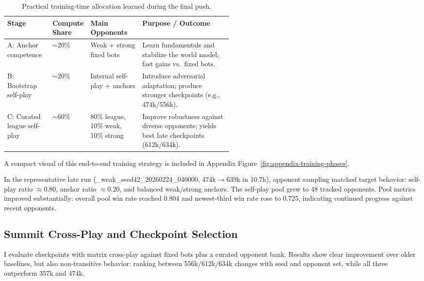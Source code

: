 \documentclass[11pt]{article}
\begin{document}
\begin{table}[h]
\centering
\footnotesize
\setlength{\tabcolsep}{4pt}
\begin{tabularx}{\linewidth}{@{}p{0.20\linewidth}p{0.11\linewidth}p{0.23\linewidth}X@{}}
\toprule
\textbf{Stage} & \textbf{Compute Share} & \textbf{Main Opponents} & \textbf{Purpose / Outcome} \\
\midrule
A: Anchor competence & $\sim$20\% & Weak + strong fixed bots & Learn fundamentals and stabilize the world model; fast gains vs.\ fixed bots. \\
B: Bootstrap self-play & $\sim$20\% & Internal self-play + anchors & Introduce adversarial adaptation; produce stronger checkpoints (e.g., 474k/556k). \\
C: Curated league self-play & $\sim$60\% & 80\% league, 10\% weak, 10\% strong & Improve robustness against diverse opponents; yields best late checkpoints (612k/634k). \\
\bottomrule
\end{tabularx}
\caption{Practical training-time allocation learned during the final push.}
\label{tab:training-phases}
\end{table}

A compact visual of this end-to-end training strategy is included in Appendix Figure~\ref{fig:appendix-training-phases}.

In the representative late run (\_weak\_seed42\_20260224\_040000, 474k$\rightarrow$639k in 10.7h), opponent sampling matched target behavior: self-play ratio $\approx0.80$, anchor ratio $\approx0.20$, and balanced weak/strong anchors. The self-play pool grew to 48 tracked opponents. Pool metrics improved substantially: overall pool win rate reached 0.804 and newest-third win rate rose to 0.725, indicating continued progress against recent opponents.

\subsection{Summit Cross-Play and Checkpoint Selection}

I evaluate checkpoints with matrix cross-play against fixed bots plus a curated opponent bank. Results show clear improvement over older baselines, but also non-transitive behavior: ranking between 556k/612k/634k changes with seed and opponent set, while all three outperform 357k and 474k.
\end{document}
